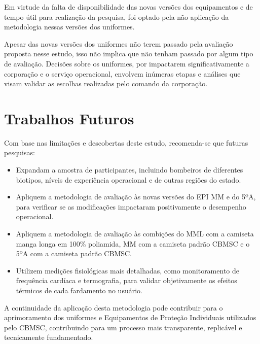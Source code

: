             Em virtude da falta de disponibilidade das novas versões dos equipamentos e de tempo útil 
            para realização da pesquisa, foi optado pela não aplicação da metodologia nessas 
            versões dos uniformes.

            Apesar das novas versões dos uniformes não terem passado pela avaliação proposta nesse estudo, 
            isso não implica que não tenham passado por algum tipo de avaliação. Decisões sobre os uniformes, 
            por impactarem significativamente a corporação e o serviço operacional, envolvem inúmeras etapas e 
            análises que visam validar as escolhas realizadas pelo comando da corporação. 

    \section{Trabalhos Futuros}
        Com base nas limitações e descobertas deste estudo, recomenda-se que futuras pesquisas:

        \begin{itemize}
            \item Expandam a amostra de participantes, incluindo bombeiros de diferentes biotipos, 
            níveis de experiência operacional e de outras regiões do estado.
            \item Apliquem a metodologia de avaliação às novas versões do \acrshort{EPI} \acrshort{MM} 
            e do 5ºA, para verificar se as modificações impactaram positivamente o desempenho operacional.
            \item Apliquem a metodologia de avaliação às combições do \acrshort{MML} com a camiseta manga 
            longa em 100\% poliamida, \acrshort{MM} com a camiseta padrão \acrshort{CBMSC} e o 5ºA com 
            a camiseta padrão \acrshort{CBMSC}.
            \item Utilizem medições fisiológicas mais detalhadas, como monitoramento de frequência 
            cardíaca e termografia, para validar objetivamente os efeitos térmicos de cada fardamento no usuário.
        \end{itemize}

        A continuidade da aplicação desta metodologia pode contribuir para o aprimoramento dos uniformes e
        Equipamentos de Proteção Individuais utilizados pelo \acrshort{CBMSC}, contribuindo para um processo 
        mais transparente, replicável e tecnicamente fundamentado.